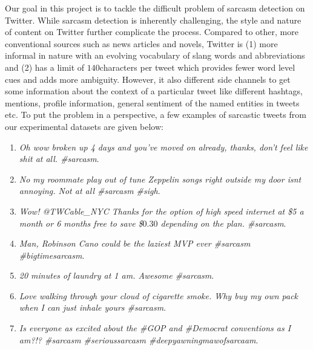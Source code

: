 Our goal in this project is to tackle the difficult problem of sarcasm detection on Twitter. While sarcasm detection
is inherently challenging, the style and nature of content on Twitter further complicate the process. Compared to other,
more conventional sources such as news articles and novels, Twitter is (1) more informal in nature with an evolving vocabulary of slang words and abbreviations and (2) has a limit of $140 $characters per tweet which provides fewer word level
cues and adds more ambiguity. However, it also different side channels to get some information about the context of a particular tweet like different hashtags, mentions, profile information, general sentiment of the named entities in tweets etc. To put the problem in a perspective, a few examples of sarcastic tweets from our experimental datasets are given below:
\begin{enumerate}
 \item \textit{Oh wow broken up 4 days and you've moved on already, thanks, don't feel like shit at all. \#sarcasm}.\\
 \item \textit{No my roommate play out of tune Zeppelin songs right outside my door isnt annoying. Not at all \#sarcasm \#sigh}.\\
 \item \textit{Wow! @TWCable\_NYC Thanks for the option of high speed internet at \$5 a month or 6 months free to save \$$0.30$ depending on the plan. \#sarcasm}.\\
 \item \textit{Man, Robinson Cano could be the laziest MVP ever \#sarcasm \#bigtimesarcasm}.\\
 \item \textit{20 minutes of laundry at 1 am. Awesome \#sarcasm}.\\
 \item \textit{Love walking through your cloud of cigarette smoke. Why buy my own pack when I can just inhale yours \#sarcasm}.\\
 \item \textit{Is everyone as excited about the \#GOP and \#Democrat conventions as I am?!? \#sarcasm \#serioussarcasm \#deepyawningmawofsarcaam}.\\
\end{enumerate}

